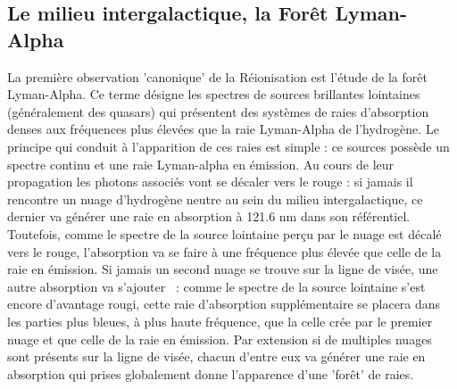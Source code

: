 \subsection{Le milieu intergalactique, la Forêt Lyman-Alpha}
La première observation 'canonique' de la Réionisation est l'étude de la forêt Lyman-Alpha. Ce terme désigne les spectres de sources brillantes lointaines (généralement des quasars) qui présentent des systèmes de raies d'absorption denses aux fréquences plus élevées que la raie Lyman-Alpha de l'hydrogène. Le principe qui conduit à l'apparition de ces raies est simple : ce sources possède un spectre continu et une raie Lyman-alpha en émission. Au cours de leur propagation les photons associés vont se décaler vers le rouge : si jamais il rencontre un nuage d'hydrogène neutre au sein du milieu intergalactique, ce dernier va générer une raie en absorption à 121.6 nm dans son référentiel. Toutefois, comme le spectre de la source lointaine perçu par le nuage est décalé vers le rouge, l'absorption va se faire à une fréquence plus élevée que celle de la raie en émission. Si jamais un second nuage se trouve sur la ligne de visée, une autre absorption va s'ajouter ~: comme le spectre de la source lointaine s'est encore d'avantage rougi, cette raie d'absorption supplémentaire se placera dans les parties plus bleues, à plus haute fréquence, que la celle crée par le premier nuage et que celle de la raie en émission. Par extension si de multiples nuages sont présents sur la ligne de visée, chacun d'entre eux va générer une raie en absorption qui prises globalement donne l'apparence d'une 'forêt' de raies.

